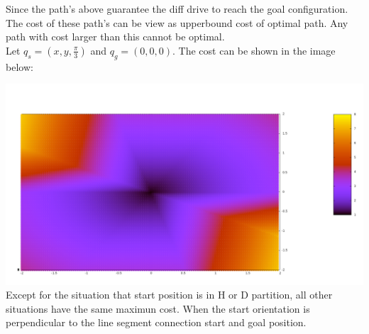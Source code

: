 \documentclass[12pt]{article}
\begin{document}
  Since the path's above guarantee the diff drive to reach the goal configuration. The cost of these path's can be view as upperbound cost of optimal path. Any path with cost larger than this cannot be optimal. \\
  
  Let $q_{s} = (x,y,\frac{\pi}{3})$ and $q_{g} = (0,0,0)$. The cost can be shown in the image below:
  
  \includegraphics[scale=0.27]{CostImage}\\
  
  Except for the situation that start position is in H or D partition, all other situations have the same maximun cost. When the start orientation is perpendicular to the line segment connection start and goal position.\\
  
\end{document}
